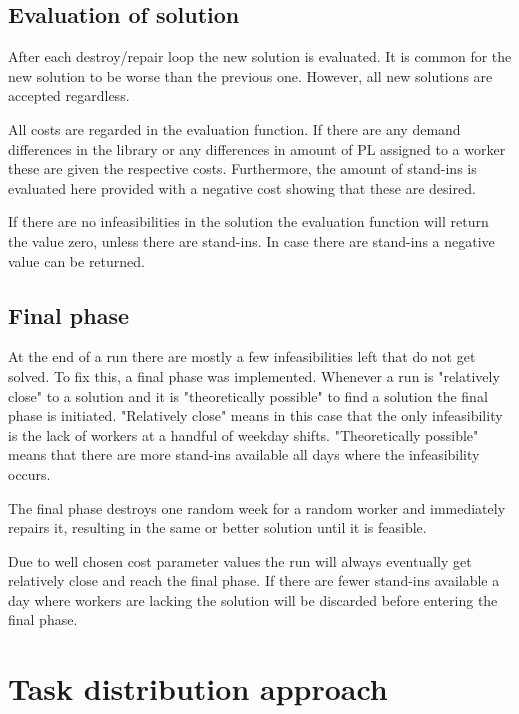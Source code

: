 \subsection{Evaluation of solution}
After each destroy/repair loop the new solution is evaluated. It is common for the new solution to be worse than the previous one. However, all new solutions are accepted regardless.

All costs are regarded in the evaluation function. If there are any demand differences in the library or any differences in amount of PL assigned to a worker these are given the respective costs. Furthermore, the amount of stand-ins is evaluated here provided with a negative cost showing that these are desired.

If there are no infeasibilities in the solution the evaluation function will return the value zero, unless there are stand-ins. In case there are stand-ins a negative value can be returned. 
\subsection{Final phase}
At the end of a run there are mostly a few infeasibilities left that do not get solved. To fix this, a final phase was implemented. Whenever a run is "relatively close" to a solution and it is "theoretically possible" to find a solution the final phase is initiated. "Relatively close" means in this case that the only infeasibility is the lack of workers at a handful of weekday shifts. "Theoretically possible" means that there are more stand-ins available all days where the infeasibility occurs.

The final phase destroys one random week for a random worker and immediately repairs it, resulting in the same or better solution until it is feasible. %

Due to well chosen cost parameter values the run will always eventually get relatively close and reach the final phase. If there are fewer stand-ins available a day where workers are lacking the solution will be discarded before entering the final phase. 

\section{Task distribution approach} \label{section:impl_task_dist}

